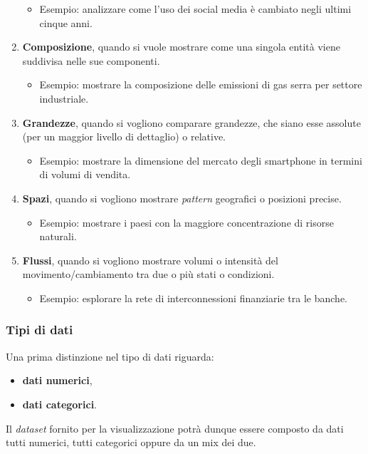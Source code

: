 \begin{enumerate}
    \begin{itemize}
        \item Esempio: analizzare come l'uso dei social media è cambiato negli ultimi cinque anni.
    \end{itemize}
    \item \textbf{Composizione}, quando si vuole mostrare come una singola entità viene suddivisa nelle sue componenti.
    \begin{itemize}
        \item Esempio: mostrare la composizione delle emissioni di gas serra per settore industriale.
    \end{itemize}
    \item \textbf{Grandezze}, quando si vogliono comparare grandezze, che siano esse assolute (per un maggior livello di dettaglio) o relative. 
    \begin{itemize}
        \item Esempio: mostrare la dimensione del mercato degli smartphone in termini di volumi di vendita.
    \end{itemize}
    \item \textbf{Spazi}, quando si vogliono mostrare \emph{pattern} geografici o posizioni precise.
    \begin{itemize}
        \item Esempio: mostrare i paesi con la maggiore concentrazione di risorse naturali.
    \end{itemize}
    \item \textbf{Flussi}, quando si vogliono mostrare volumi o intensità del movimento/cambiamento tra due o più stati o condizioni.
    \begin{itemize}
        \item Esempio: esplorare la rete di interconnessioni finanziarie tra le banche.
    \end{itemize}
\end{enumerate}

\subsubsection{Tipi di dati}
Una prima distinzione nel tipo di dati riguarda:
\begin{itemize}
    \item \textbf{dati numerici},
    \item \textbf{dati categorici}.
\end{itemize}
Il \emph{dataset} fornito per la visualizzazione potrà dunque essere composto da dati tutti numerici, tutti categorici oppure da un mix dei due.

